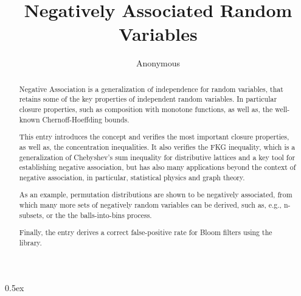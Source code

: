 \documentclass[11pt,a4paper]{article}
\begin{document}
\title{Negatively Associated Random Variables}
\author{Anonymous}
\maketitle

\begin{abstract}
Negative Association is a generalization of independence for random variables, that retains some
of the key properties of independent random variables. In particular closure properties, such as
composition with monotone functions, as well as, the well-known Chernoff-Hoeffding bounds.

This entry introduces the concept and verifies the most important closure properties, as well as,
the concentration inequalities. It also verifies the FKG inequality, which is a generalization of
Chebyshev's sum inequality for distributive lattices and a key tool for establishing negative
association, but has also many applications beyond the context of negative association, in
particular, statistical physics and graph theory.

As an example, permutation distributions are shown to be negatively associated, from which
many more sets of negatively random variables can be derived, such as, e.g., n-subsets, or the
the balls-into-bins process.

Finally, the entry derives a correct false-positive rate for Bloom filters using the library.
\end{abstract}

\tableofcontents

\parindent 0pt\parskip 0.5ex





\end{document}
